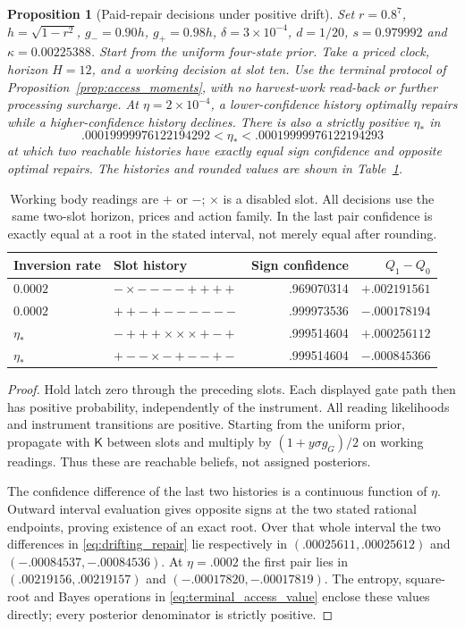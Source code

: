 \documentclass[12pt]{article}
\newtheorem{proposition}[theorem]{Proposition}
\theoremstyle{definition}
\begin{document}
\begin{proposition}[Paid-repair decisions under positive drift]
\label{prop:repair_rates}
Set $r=0.8^7$, $h=\sqrt{1-r^2}$, $g_-=0.90h$, $g_+=0.98h$,
$\delta=3\times10^{-4}$, $d=1/20$, $s=0.979992$ and
$\kappa=0.00225388$. Start from the uniform four-state prior. Take
a priced clock, horizon $H=12$, and a working decision at slot ten.
Use the terminal protocol of Proposition~\ref{prop:access_moments},
with no harvest-work read-back or further processing surcharge.
At $\eta=2\times10^{-4}$, a lower-confidence history optimally repairs
while a higher-confidence history declines. There is also a strictly
positive $\eta_*$ in
\[
 .00019999976122194292<\eta_*<.00019999976122194293
\]
at which two reachable histories have exactly equal sign confidence
and opposite optimal repairs. The histories and rounded values are
shown in Table~\ref{tab:repair_drift}.
\end{proposition}

\begin{table}[ht]
\centering\small
\begin{tabular}{@{}llrr@{}}
\toprule
Inversion rate & Slot history & Sign confidence & $Q_1-Q_0$\\
\midrule
$0.0002$ & $-\times----++++$ & .969070314 & $+.002191561$\\
$0.0002$ & $++-+------$ & .999973536 & $-.000178194$\\
$\eta_*$ & $-+++\times\times\times+-+$ & .999514604 & $+.000256112$\\
$\eta_*$ & $+--\times-+--+-$ & .999514604 & $-.000845366$\\
\bottomrule
\end{tabular}
\caption{Working body readings are $+$ or $-$; $\times$ is a disabled
slot. All decisions use the same two-slot horizon, prices and action
family. In the last pair confidence is exactly equal at a root in
the stated interval, not merely equal after rounding.}
\label{tab:repair_drift}
\end{table}

\begin{proof}
Hold latch zero through the preceding slots. Each displayed gate path
then has positive probability, independently of the instrument.
All reading likelihoods and instrument transitions are positive.
Starting from the uniform prior, propagate with $\mathsf K$ between
slots and multiply by $(1+y\sigma g_G)/2$ on working readings.
Thus these are reachable beliefs, not assigned posteriors.

The confidence difference of the last two histories is a continuous
function of $\eta$. Outward interval evaluation gives opposite signs
at the two stated rational endpoints, proving existence of an exact
root. Over that whole interval the two differences in
\eqref{eq:drifting_repair} lie respectively in
$(.00025611,.00025612)$ and $(-.00084537,-.00084536)$.
At $\eta=.0002$ the first pair lies in
$(.00219156,.00219157)$ and $(-.00017820,-.00017819)$.
The entropy, square-root and Bayes operations in
\eqref{eq:terminal_access_value} enclose these values directly;
every posterior denominator is strictly positive.
\end{proof}
\end{document}
